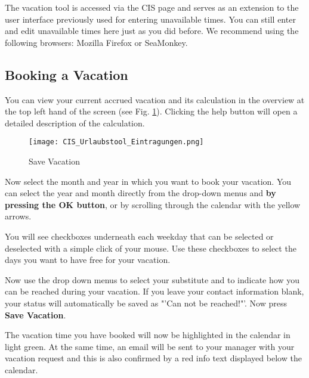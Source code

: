 The vacation tool is accessed via the CIS page and serves as an extension to the user interface previously used for entering unavailable times. You can still enter and edit unavailable times here just as you did before.
We recommend using the following browsers: Mozilla Firefox or SeaMonkey.

\subsection{Booking a Vacation}

You can view your current accrued vacation and its calculation in the overview at the top left hand of the screen (see Fig. \ref{CIS_urlaubstool_eintragungen}). Clicking the help button will open a detailed description of the calculation.

\begin{figure}
	\centering
	\texttt{[image: CIS\_Urlaubstool\_Eintragungen.png]}
	\caption{Save Vacation}
	\label{CIS_urlaubstool_eintragungen}
\end{figure}

Now select the month and year in which you want to book your vacation. You can select the year and month directly from the drop-down menus and \textbf{by pressing the OK button}, or by scrolling through the calendar with the yellow arrows.

You will see checkboxes underneath each weekday that can be selected or deselected with a simple click of your mouse.  Use these checkboxes to select the days you want to have free for your vacation.


Now use the drop down menus to select your substitute and to indicate how you can be reached during your vacation. 
If you leave your contact information blank, your status will automatically be saved as "'Can not be reached!"'. Now press \textbf{Save Vacation}. 

The vacation time you have booked will now be highlighted in the calendar in light green. At the same time, an email will be sent to your manager with your vacation request and this is also confirmed by a red info text displayed below the calendar.



